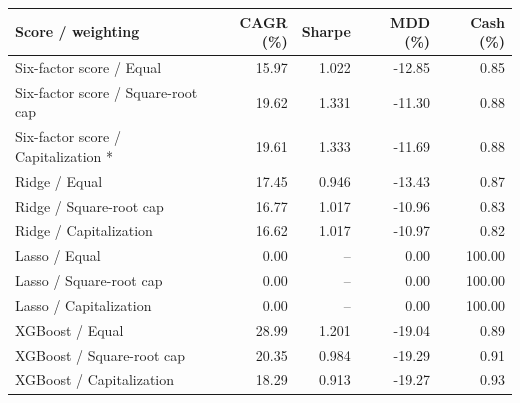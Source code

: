 \begin{tabular}{lrrrr}
\toprule
Score / weighting & CAGR (\%) & Sharpe & MDD (\%) & Cash (\%) \\
\midrule
Six-factor score / Equal & 15.97 & 1.022 & -12.85 & 0.85 \\
Six-factor score / Square-root cap & 19.62 & 1.331 & -11.30 & 0.88 \\
Six-factor score / Capitalization * & 19.61 & 1.333 & -11.69 & 0.88 \\
Ridge / Equal & 17.45 & 0.946 & -13.43 & 0.87 \\
Ridge / Square-root cap & 16.77 & 1.017 & -10.96 & 0.83 \\
Ridge / Capitalization & 16.62 & 1.017 & -10.97 & 0.82 \\
Lasso / Equal & 0.00 & -- & 0.00 & 100.00 \\
Lasso / Square-root cap & 0.00 & -- & 0.00 & 100.00 \\
Lasso / Capitalization & 0.00 & -- & 0.00 & 100.00 \\
XGBoost / Equal & 28.99 & 1.201 & -19.04 & 0.89 \\
XGBoost / Square-root cap & 20.35 & 0.984 & -19.29 & 0.91 \\
XGBoost / Capitalization & 18.29 & 0.913 & -19.27 & 0.93 \\
\bottomrule
\end{tabular}
